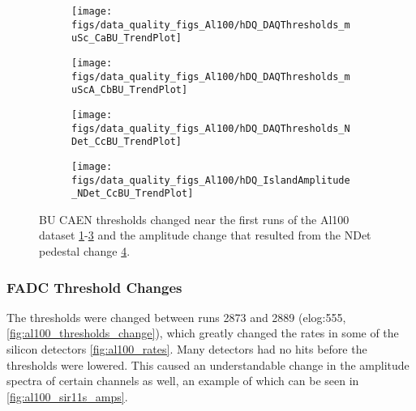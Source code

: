 \documentclass[a4paper]{article}
\begin{document}
\begin{figure}
  \centering
  \begin{subfigure}{0.4\textwidth}
    \texttt{[image: figs/data\_quality\_figs\_Al100/hDQ\_DAQThresholds\_muSc\_CaBU\_TrendPlot]}
    \caption{}\label{fig:al100_cabu_thresh}
  \end{subfigure}%
  \begin{subfigure}{0.4\textwidth}
    \texttt{[image: figs/data\_quality\_figs\_Al100/hDQ\_DAQThresholds\_muScA\_CbBU\_TrendPlot]}
    \caption{}\label{fig:al100_cbbu_thresh}
  \end{subfigure}
  \begin{subfigure}{0.4\textwidth}
    \texttt{[image: figs/data\_quality\_figs\_Al100/hDQ\_DAQThresholds\_NDet\_CcBU\_TrendPlot]}
    \caption{}\label{fig:al100_ccbu_thresh}
  \end{subfigure}%
  \begin{subfigure}{0.4\textwidth}
    \texttt{[image: figs/data\_quality\_figs\_Al100/hDQ\_IslandAmplitude\_NDet\_CcBU\_TrendPlot]}
    \caption{}\label{fig:al100_ndet_amps}
  \end{subfigure}
  \caption{BU CAEN thresholds changed near the first runs of the Al100 dataset \ref{fig:al100_cabu_thresh}-\ref{fig:al100_ccbu_thresh}
    and the amplitude change that resulted from the NDet pedestal change \ref{fig:al100_ndet_amps}.}
  \label{fig:al100_caen_changes}
\end{figure}


\subsubsection{FADC Threshold Changes}
\label{sec:al100_threshold_changes}

The thresholds were changed between runs 2873 and 2889 (elog:555, \ref{fig:al100_thresholds_change}),
which greatly changed the rates in some of the silicon detectors \ref{fig:al100_rates}.
Many detectors had no hits before the thresholds were lowered. This caused an understandable
change in the amplitude spectra of certain channels as well, an example of which can
be seen in \ref{fig:al100_sir11s_amps}.
\end{document}
